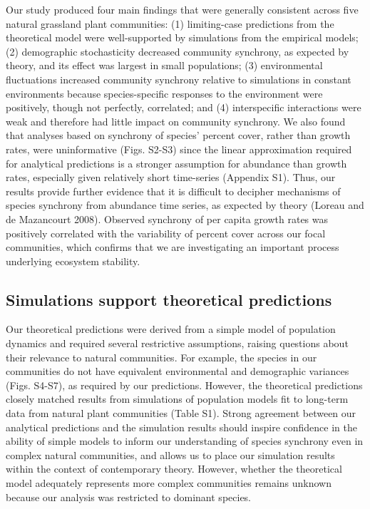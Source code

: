 \documentclass[12pt,]{article}
\begin{document}
Our study produced four main findings that were generally consistent
across five natural grassland plant communities: (1) limiting-case predictions
from the theoretical model were well-supported by simulations from the
empirical models; (2) demographic stochasticity decreased community
synchrony, as expected by theory, and its effect was largest in small
populations; (3) environmental fluctuations increased community
synchrony relative to simulations in constant environments because
species-specific responses to the environment were positively, though
not perfectly, correlated; and (4) interspecific interactions were weak
and therefore had little impact on community synchrony. We also found
that analyses based on synchrony of species' percent cover, rather than
growth rates, were uninformative (Figs. S2-S3) since the linear
approximation required for analytical predictions is a stronger
assumption for abundance than growth rates, especially given relatively
short time-series (Appendix S1). Thus, our results provide further
evidence that it is difficult to decipher mechanisms of species
synchrony from abundance time series, as expected by theory (Loreau and
{{de Mazancourt}} 2008). Observed synchrony of per capita growth rates
was positively correlated with the variability of percent cover across
our focal communities, which confirms that we are investigating an
important process underlying ecosystem stability.

\subsection{Simulations support theoretical predictions}

Our theoretical predictions were derived from a simple model of
population dynamics and required several restrictive assumptions,
raising questions about their relevance to natural communities. For
example, the species in our communities do not have equivalent
environmental and demographic variances (Figs. S4-S7), as required by
our predictions. However, the theoretical predictions closely matched
results from simulations of population models fit to long-term data from
natural plant communities (Table S1). Strong agreement between our
analytical predictions and the simulation results should inspire
confidence in the ability of simple models to inform our understanding
of species synchrony even in complex natural communities, and allows us
to place our simulation results within the context of contemporary
theory.
However, whether the theoretical model adequately represents more complex communities remains unknown because our analysis was restricted to dominant species.
\end{document}
